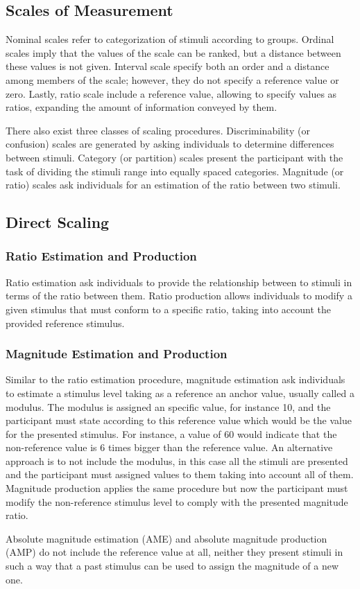 \subsection{Scales of Measurement}

Nominal scales refer to categorization of stimuli according to groups. Ordinal
scales imply that the values of the scale can be ranked, but a distance between
these values is not given. Interval scale specify both an order and a distance
among members of the scale; however, they do not specify a reference value or
zero. Lastly, ratio scale include a reference value, allowing to specify values
as ratios, expanding the amount of information conveyed by them.

There also exist three classes of scaling procedures. Discriminability (or
confusion) scales are generated by asking individuals to determine differences
between stimuli. Category (or partition) scales present the participant with the
task of dividing the stimuli range into equally spaced categories. Magnitude (or
ratio) scales ask individuals for an estimation of the ratio between two
stimuli.

\subsection{Direct Scaling}

\subsubsection{Ratio Estimation and Production}

Ratio estimation ask individuals to provide the relationship between to stimuli
in terms of the ratio between them. Ratio production allows individuals to
modify a given stimulus that must conform to a specific ratio, taking into
account the provided reference stimulus.

\subsubsection{Magnitude Estimation and Production}

Similar to the ratio estimation procedure, magnitude estimation ask individuals
to estimate a stimulus level taking as a reference an anchor value, usually
called a modulus. The modulus is assigned an specific value, for instance 10,
and the participant must state according to this reference value which would be
the value for the presented stimulus. For instance, a value of 60 would indicate
that the non-reference value is 6 times bigger than the reference value. An
alternative approach is to not include the modulus, in this case all the stimuli
are presented and the participant must assigned values to them taking into
account all of them. Magnitude production applies the same procedure but now the
participant must modify the non-reference stimulus level to comply with the
presented magnitude ratio.

Absolute magnitude estimation (AME) and absolute magnitude production (AMP)
do not include the reference value at all, neither they present stimuli in such
a way that a past stimulus can be used to assign the magnitude of a new one.
